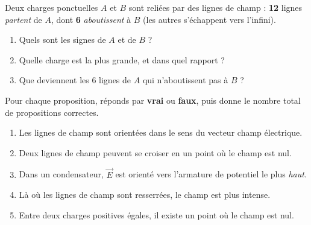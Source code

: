 \documentclass[11pt,a4paper]{article}
\newcommand{\vv}[1]{\vec{#1}}\newcommand{\ds}{\displaystyle}
\begin{document}
\begin{exo}
Deux charges ponctuelles $A$ et $B$ sont reliées par des lignes de champ : \textbf{12} lignes
\emph{partent} de $A$, dont \textbf{6} \emph{aboutissent} à $B$ (les autres s'échappent vers
l'infini).
\begin{enumerate}[label=\alph*)]
  \item Quels sont les signes de $A$ et de $B$ ?
  \item Quelle charge est la plus grande, et dans quel rapport ?
  \item Que deviennent les $6$ lignes de $A$ qui n'aboutissent pas à $B$ ?
\end{enumerate}
\end{exo}

\begin{exo}
Pour chaque proposition, réponds par \textbf{vrai} ou \textbf{faux}, puis donne le nombre total de
propositions correctes.
\begin{enumerate}[label=\alph*)]
  \item Les lignes de champ sont orientées dans le sens du vecteur champ électrique.
  \item Deux lignes de champ peuvent se croiser en un point où le champ est nul.
  \item Dans un condensateur, $\vv{E}$ est orienté vers l'armature de potentiel le plus \emph{haut}.
  \item Là où les lignes de champ sont resserrées, le champ est plus intense.
  \item Entre deux charges positives égales, il existe un point où le champ est nul.
\end{enumerate}
\end{exo}
\end{document}
